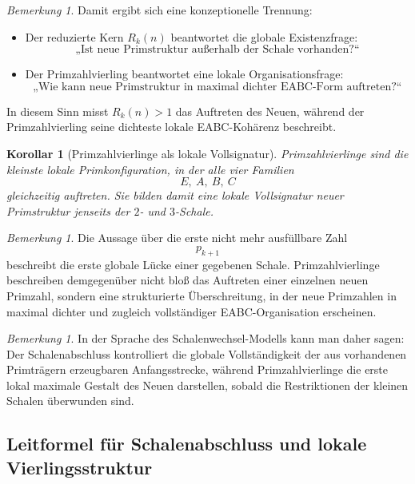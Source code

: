 \documentclass[11pt,a4paper]{article}
\newtheorem{korollar}[satz]{Korollar}
\theoremstyle{definition}
\theoremstyle{remark}
\newtheorem{bemerkung}[satz]{Bemerkung}
\begin{document}
	\begin{bemerkung}
		Damit ergibt sich eine konzeptionelle Trennung:
		
		\begin{itemize}
			\item Der reduzierte Kern \(R_k(n)\) beantwortet die globale Existenzfrage:
			\[
			\text{„Ist neue Primstruktur außerhalb der Schale vorhanden?“}
			\]
			
			\item Der Primzahlvierling beantwortet eine lokale Organisationsfrage:
			\[
			\text{„Wie kann neue Primstruktur in maximal dichter EABC-Form auftreten?“}
			\]
		\end{itemize}
		
		In diesem Sinn misst \(R_k(n)>1\) das Auftreten des Neuen, während der Primzahlvierling
		seine dichteste lokale EABC-Kohärenz beschreibt.
	\end{bemerkung}
	
	\begin{korollar}[Primzahlvierlinge als lokale Vollsignatur]
		\label{kor:vierling_vollsignatur}
		Primzahlvierlinge sind die kleinste lokale Primkonfiguration, in der alle vier Familien
		\[
		E,\ A,\ B,\ C
		\]
		gleichzeitig auftreten. Sie bilden damit eine lokale Vollsignatur neuer Primstruktur
		jenseits der \(2\)- und \(3\)-Schale.
	\end{korollar}
	
	\begin{bemerkung}
		Die Aussage über die erste nicht mehr ausfüllbare Zahl
		\[
		p_{k+1}
		\]
		beschreibt die erste globale Lücke einer gegebenen Schale. Primzahlvierlinge beschreiben
		demgegenüber nicht bloß das Auftreten einer einzelnen neuen Primzahl, sondern eine
		strukturierte Überschreitung, in der neue Primzahlen in maximal dichter und zugleich
		vollständiger EABC-Organisation erscheinen.
	\end{bemerkung}
	
	\begin{bemerkung}
		In der Sprache des Schalenwechsel-Modells kann man daher sagen: Der Schalenabschluss
		kontrolliert die globale Vollständigkeit der aus vorhandenen Primträgern erzeugbaren
		Anfangsstrecke, während Primzahlvierlinge die erste lokal maximale Gestalt des Neuen
		darstellen, sobald die Restriktionen der kleinen Schalen überwunden sind.
	\end{bemerkung}
	
	\subsection{Leitformel für Schalenabschluss und lokale Vierlingsstruktur}
	
\end{document}
